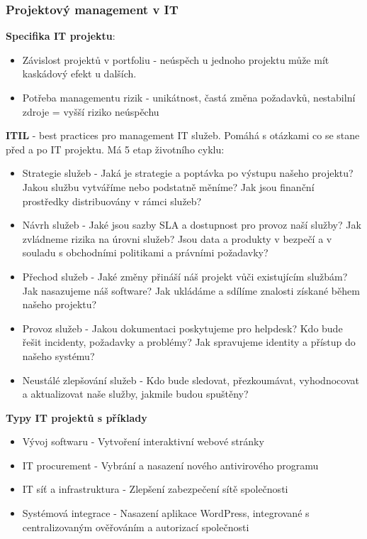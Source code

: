 \documentclass[11pt,a4paper]{article}
\begin{document}
    \subsubsection{Projektový management v IT}
        \textbf{Specifika IT projektu}:
        \begin{itemize}
            \item Závislost projektů v portfoliu - neúspěch u jednoho projektu může mít kaskádový efekt u dalších.
            \item Potřeba managementu rizik - unikátnost, častá změna požadavků, nestabilní zdroje = vyšší riziko neúspěchu
        \end{itemize}
        \textbf{ITIL} - best practices pro management IT služeb. Pomáhá s otázkami co se stane před a po IT projektu. Má 5 etap životního cyklu:
        \begin{itemize}
            \item Strategie služeb - Jaká je strategie a poptávka po výstupu našeho projektu? Jakou službu vytváříme nebo podstatně měníme? Jak jsou finanční prostředky distribuovány v rámci služeb?
            \item Návrh služeb - Jaké jsou sazby SLA a dostupnost pro provoz naší služby? Jak zvládneme rizika na úrovni služeb? Jsou data a produkty v bezpečí a v souladu s obchodními politikami a právními požadavky?
            \item Přechod služeb - Jaké změny přináší náš projekt vůči existujícím službám? Jak nasazujeme náš software? Jak ukládáme a sdílíme znalosti získané během našeho projektu?
            \item Provoz služeb - Jakou dokumentaci poskytujeme pro helpdesk? Kdo bude řešit incidenty, požadavky a problémy? Jak spravujeme identity a přístup do našeho systému?
            \item Neustálé zlepšování služeb - Kdo bude sledovat, přezkoumávat, vyhodnocovat a aktualizovat naše služby, jakmile budou spuštěny?
        \end{itemize}
        \textbf{Typy IT projektů s příklady}
        \begin{itemize}
            \item Vývoj softwaru - Vytvoření interaktivní webové stránky
            \item IT procurement - Vybrání a nasazení nového antivirového programu
            \item IT síť a infrastruktura - Zlepšení zabezpečení sítě společnosti
            \item Systémová integrace - Nasazení aplikace WordPress, integrované s centralizovaným ověřováním a autorizací společnosti
        \end{itemize}
\end{document}

